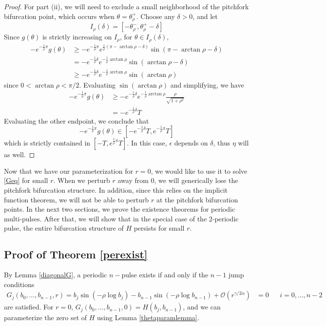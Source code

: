 \documentclass[thesis.tex]{subfiles}
\begin{document}
\begin{lemma}
\begin{proof}
For part (ii), we will need to exclude a small neighborhood of the pitchfork bifurcation point, which occurs when $\theta = \theta_\rho^+$. Choose any $\delta > 0$, and let 
\[
I_\rho(\delta) = [-\theta_\rho^-, \theta_\rho^+ - \delta]
\]
Since $g(\theta)$ is strictly increasing on $I_\rho$, for $\theta \in I_\rho(\delta)$,
\begin{align*}
-e^{ -\frac{1}{\rho} \pi } g(\theta) &\geq 
 -e^{ -\frac{1}{\rho} \pi } e^{ \frac{1}{\rho}(\pi - \arctan \rho - \delta) } \sin(\pi - \arctan \rho - \delta) \\
&= -e^{-\frac{1}{\rho}\delta} e^{-\frac{1}{\rho}\arctan\rho}\sin(\arctan \rho - \delta) \\
&\geq -e^{-\frac{1}{\rho}\delta} e^{-\frac{1}{\rho}\arctan\rho}\sin(\arctan \rho)
\end{align*}
since $0 < \arctan \rho < \pi/2$. Evaluating $\sin(\arctan\rho)$ and simplifying, we have
\begin{align*}
-e^{ -\frac{1}{\rho} \pi } g(\theta)
&\geq -e^{-\frac{1}{\rho}\delta} e^{-\frac{1}{\rho}\arctan\rho}\frac{\rho}{\sqrt{1 + \rho^2}} \\
&= -e^{-\frac{1}{\rho}\delta} T
\end{align*}
Evaluating the other endpoint, we conclude that
\[
-e^{ -\frac{1}{\rho} \pi } g(\theta)
\in [-e^{-\frac{1}{\rho}\delta} T, e^{-\frac{1}{\rho}\pi}T]
\]
which is strictly contained in $[-T,e^{\frac{1}{\rho}\pi}T]$. In this case, $\epsilon$ depends on $\delta$, thus $\eta$ will as well.
\end{proof}
\end{lemma}

Now that we have our parameterization for $r = 0$, we would like to use it to solve \eqref{Geq} for small $r$. When we perturb $r$ away from 0, we will generically lose the pitchfork bifurcation structure. In addition, since this relies on the implicit function theorem, we will not be able to perturb $r$ at the pitchfork bifurcation points. In the next two sections, we prove the existence theorems for periodic multi-pulses. After that, we will show that in the special case of the 2-periodic pulse, the entire bifurcation structure of $H$ persists for small $r$.

\subsection{Proof of Theorem \ref{perexist}}

By Lemma \ref{diagonalG}, a periodic $n-$pulse exists if and only if the $n-1$ jump conditions
\begin{align}\label{Geq2}
G_j(b_0, \dots, b_{n-1}, r) = b_j \sin \left( -\rho \log b_j \right) - b_{n-1} \sin \left( -\rho \log b_{n-1} \right) + \mathcal{O}(r^{\gamma / 2 \alpha}) &= 0 && i = 0, \dots, n-2
\end{align}
are satisfied. For $r = 0$, $G_j(b_0, \dots, b_{n-1}, 0) = H(b_j, b_{n-1})$, and we can parameterize the zero set of $H$ using Lemma \ref{thetaparamlemma}. 
\end{document}
